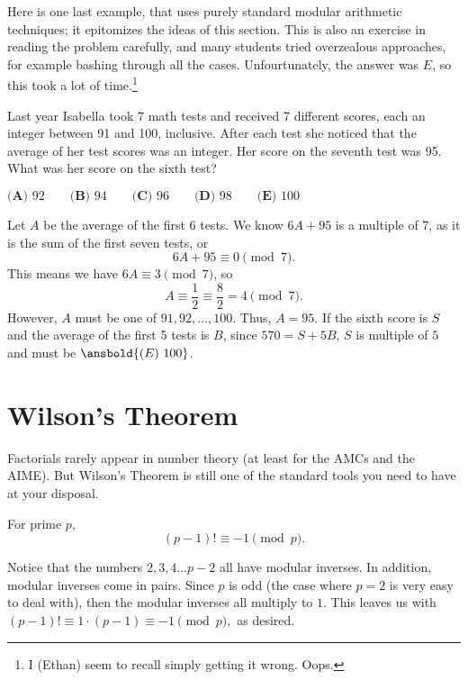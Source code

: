 \documentclass[mast]{lucky}
\begin{document}
Here is one last example, that uses purely standard modular arithmetic techniques; it epitomizes the ideas of this section. This is also an exercise in reading the problem carefully, and many students tried overzealous approaches, for example bashing through all the cases. Unfourtunately, the answer was $E$, so this took a lot of time.\footnote{I (Ethan) seem to recall simply getting it wrong. Oops.}

\begin{exam}[AMC 10B 2017/25]
Last year Isabella took 7 math tests and received 7 different scores, each an integer between 91 and 100, inclusive. After each test she noticed that the average of her test scores was an integer. Her score on the seventh test was 95. What was her score on the sixth test?

$\textbf{(A)} \text{ 92} \qquad \textbf{(B)} \text{ 94} \qquad \textbf{(C)} \text{ 96} \qquad \textbf{(D)} \text{ 98} \qquad \textbf{(E)} \text{ 100}$
\end{exam}

\begin{sol}
Let $A$ be the average of the first 6 tests. We know $6A + 95$ is a multiple of 7, as it is the sum of the first seven tests, or \[6A + 95 \equiv 0 \pmod{7}\text{.}\] This means we have $6A  \equiv 3 \pmod 7$, so \[A \equiv \frac12 \equiv \frac82 = 4 \pmod{7}\text{.}\] However, $A$ must be one of ${91,92,\dots, 100}$. Thus, $A = 95$. If the sixth score is $S$ and the average of the first 5 tests is $B$, since $570 = S + 5B$, $S$ is multiple of $5$ and must be $\ansbold{(E) \ 100}$.
\end{sol}

\section{Wilson's Theorem}

Factorials rarely appear in number theory (at least for the AMCs and the AIME). But Wilson's Theorem is still one of the standard tools you need to have at your disposal.

\begin{theo}
For prime $p,$ $$(p-1)!\equiv -1\pmod{p}.$$
\end{theo}

\begin{pro}
Notice that the numbers $2,3,4\dots p-2$ all have modular inverses. In addition, modular inverses come in pairs. Since $p$ is odd (the case where $p=2$ is very easy to deal with), then the modular inverses all multiply to $1.$ This leaves us with $(p-1)!\equiv 1\cdot (p-1)\equiv -1\pmod{p},$ as desired.
\end{pro}
\end{document}
